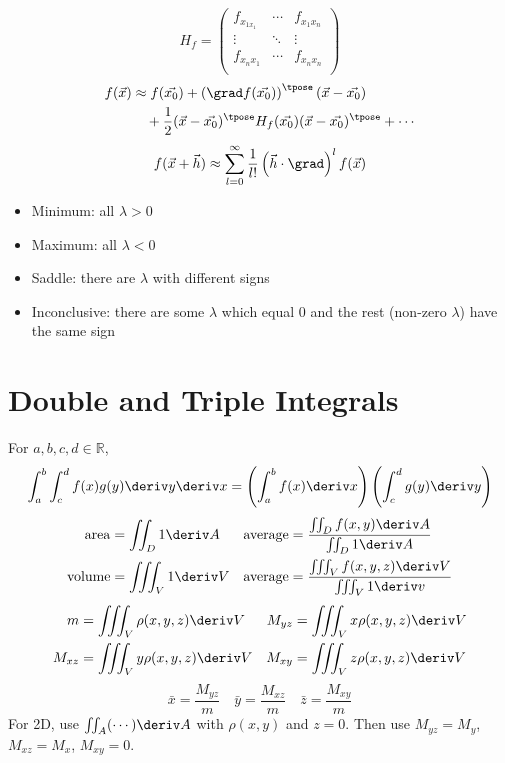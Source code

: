 \documentclass[10pt, a4paper]{article}
\begin{document}
\begin{landscape}
\begin{multicols}{3}
    \[H_{f} = \begin{pmatrix}
        f_{x_{1 x_{1}}} & \cdots & f_{x_{1} x_{n}} \\ 
        \vdots & \ddots & \vdots \\ 
        f_{x_{n} x_{1}} & \cdots & f_{x_{n} x_{n}} \\ 
    \end{pmatrix}\]
    \begin{align*}
        f(\vec{x}) &\approx f(\vec{x_0}) + \left(\grad f (\vec{x_0})\right)^{\tpose} (\vec{x} - \vec{x_0}) \\
        &\quad + \frac{1}{2} (\vec{x} - \vec{x_0})^{\tpose} H_{f}(\vec{x_0}) (\vec{x} - \vec{x_0})^{\tpose} + \cdots
    \end{align*}
    \[
        f(\vec{x} + \vec{h}) \approx \sum_{l=0}^{\infty} \frac{1}{l!} \left(\vec{h} \cdot \grad\right)^{l} f(\vec{x})
    \]
    \begin{itemize}
        \item Minimum: all \(\lambda > 0\)
        \item Maximum: all \(\lambda < 0\)
        \item Saddle: there are \(\lambda\) with different signs
        \item Inconclusive: there are some \(\lambda\) which equal 0 and the rest (non-zero \(\lambda\)) have the same sign
    \end{itemize}

    \section{Double and Triple Integrals}

    For \(a, b, c, d \in \mathbb{R}\),
    \[
        \int_{a}^{b} \int_{c}^{d} f(x) g(y) \deriv y \deriv x
        = \left(\int_{a}^{b} f(x) \deriv x\right) \left(\int_{c}^{d} g(y) \deriv y\right)
    \]
    \begin{align*}
        \mathrm{area} &= \iint_{D} 1 \deriv A  &
        \mathrm{average} &= \frac{\iint_{D} f(x, y) \deriv A}{\iint_{D} 1 \deriv A} \\
        \mathrm{volume} &= \iiint_{V} 1 \deriv V  &
        \mathrm{average} &= \frac{\iiint_{V} f(x, y, z) \deriv V}{\iiint_{V} 1 \deriv v}
    \end{align*}
    \begin{align*}
        m &= \iiint_V \rho(x, y, z) \deriv V  &  M_{yz} &= \iiint_V x \rho(x, y, z) \deriv V \\
        M_{xz} &= \iiint_V y \rho(x, y, z) \deriv V  &  M_{xy} &= \iiint_V z \rho(x, y, z) \deriv V
    \end{align*}
    \[\bar x = \frac{M_{yz}}{m} \quad \bar y = \frac{M_{xz}}{m} \quad \bar z = \frac{M_{xy}}{m}\]
    For 2D, use \(\iint_{A} (\cdots) \deriv A\) with \(\rho(x, y)\) and \(z = 0\). Then use
    \(M_{yz} = M_y\), \(M_{xz} = M_x\), \(M_{xy} = 0\).


\end{multicols}
\end{landscape}
\end{document}
